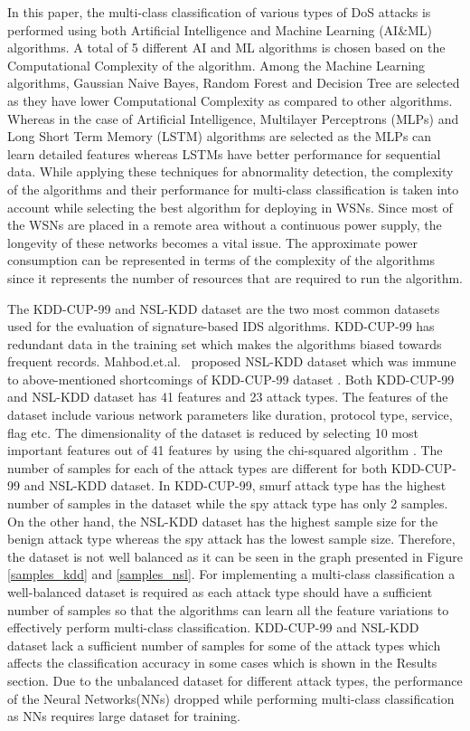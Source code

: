\documentclass[conference]{IEEEtran}
\begin{document}
In this paper, the multi-class classification of various types of DoS attacks is performed using both Artificial Intelligence and Machine Learning (AI\&ML) algorithms. A total of 5 different AI and ML algorithms is chosen based on the Computational Complexity of the algorithm. Among the Machine Learning algorithms, Gaussian Naive Bayes, Random Forest and Decision Tree are selected as they have lower Computational Complexity as compared to other algorithms. Whereas in the case of Artificial Intelligence, Multilayer Perceptrons (MLPs) and Long Short Term Memory (LSTM) algorithms are selected as the MLPs can learn detailed features whereas LSTMs have better performance for sequential data. While applying these techniques for abnormality detection, the complexity of the algorithms and their performance for multi-class classification is taken into account while selecting the best algorithm for deploying in WSNs. Since most of the WSNs are placed in a remote area without a continuous power supply, the longevity of these networks becomes a vital issue. The approximate power consumption can be represented in terms of the complexity of the algorithms since it represents the number of resources that are required to run the algorithm. 

The KDD-CUP-99 \cite{KDDcup99} and NSL-KDD dataset \cite{NSL_kdd} are the two most common datasets used for the evaluation of signature-based IDS algorithms. KDD-CUP-99 has redundant data in the training set which makes the algorithms biased towards frequent records. Mahbod.et.al.~\cite{NSL_kdd} proposed NSL-KDD dataset which was immune to above-mentioned shortcomings of KDD-CUP-99 dataset \cite{KDDcup99}. Both KDD-CUP-99 and NSL-KDD dataset has 41 features and 23 attack types. The features of the dataset include various network parameters like duration, protocol type, service, flag etc. The dimensionality of the dataset is reduced by selecting 10 most important features out of 41 features by using the chi-squared algorithm \cite{chi2}. The number of samples for each of the attack types are different for both KDD-CUP-99 and NSL-KDD dataset. In KDD-CUP-99, smurf attack type has the highest number of samples in the dataset while the spy attack type has only 2 samples. On the other hand, the NSL-KDD dataset has the highest sample size for the benign attack type whereas the spy attack has the lowest sample size. Therefore, the dataset is not well balanced as it can be seen in the graph presented in Figure \ref{samples_kdd} and \ref{samples_nsl}. For implementing a multi-class classification a well-balanced dataset is required as each attack type should have a sufficient number of samples so that the algorithms can learn all the feature variations to effectively perform multi-class classification. KDD-CUP-99 and NSL-KDD dataset lack a sufficient number of samples for some of the attack types which affects the classification accuracy in some cases which is shown in the Results section. Due to the unbalanced dataset for different attack types, the performance of the Neural Networks(NNs) dropped while performing multi-class classification as NNs requires large dataset for training.  
\end{document}
